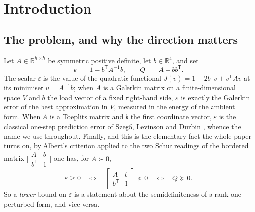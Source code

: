 \documentclass[11pt,a4paper]{article}
\theoremstyle{plain}
\theoremstyle{definition}
\newcommand{\R}{\mathbb{R}}
\newcommand{\T}{\mathsf{T}}
\newcommand{\PSD}{\succeq 0}
\newcommand{\PD}{\succ 0}
\begin{document}
\section{Introduction}
\label{sec:intro}

\subsection{The problem, and why the direction matters}

Let $A\in\R^{h\times h}$ be symmetric positive definite, let $b\in\R^{h}$, and set
\begin{equation}
\label{eq:eps-def}
  \varepsilon \;=\; 1-b^{\T}A^{-1}b,
  \qquad
  Q \;=\; A-bb^{\T}.
\end{equation}
The scalar $\varepsilon$ is the value of the quadratic functional
$J(v)=1-2b^{\T}v+v^{\T}Av$ at its minimiser $u=A^{-1}b$; when $A$ is a Galerkin
matrix on a finite-dimensional space $V$ and $b$ the load vector of a fixed
right-hand side, $\varepsilon$ is exactly the Galerkin error of the best
approximation in $V$, measured in the energy of the ambient form. When $A$ is a
Toeplitz matrix and $b$ the first coordinate vector, $\varepsilon$ is the classical
one-step prediction error of Szeg\H{o}, Levinson and Durbin
\cite{Szego1939,GrenanderSzego1958,Levinson1947,Durbin1960}, whence the name we use
throughout. Finally, and this is the elementary fact the whole paper turns on, by
Albert's criterion applied to the two Schur readings of the bordered matrix
$\bigl[\begin{smallmatrix}A&b\\b^{\T}&1\end{smallmatrix}\bigr]$ one has, for $A\PD$,
\begin{equation}
\label{eq:albert-eps}
  \varepsilon\ge 0
  \quad\Longleftrightarrow\quad
  \begin{bmatrix}A & b\\ b^{\T} & 1\end{bmatrix}\PSD
  \quad\Longleftrightarrow\quad
  Q\PSD .
\end{equation}
So a \emph{lower} bound on $\varepsilon$ is a statement about the semidefiniteness of
a rank-one-perturbed form, and vice versa.
\end{document}
